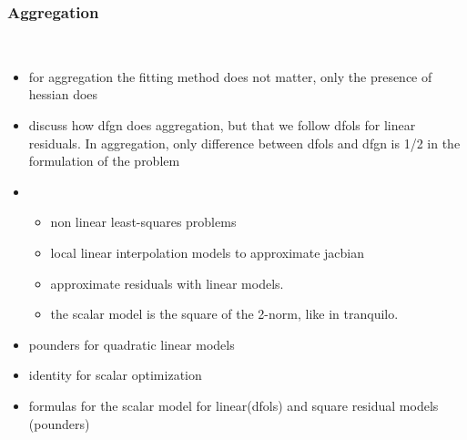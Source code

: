 \subsubsection{Aggregation}
\label{subsubsec:aggregation}
\hfill\\


\begin{itemize}
    \item for aggregation the fitting method does not matter, only the presence of hessian does
    \item discuss how dfgn does aggregation, but that we follow dfols for linear residuals. In aggregation, only difference between dfols and dfgn is 1/2 in the formulation of the problem
    \item

    \begin{itemize}
        \item non linear least-squares problems
        \item local linear interpolation models to approximate jacbian
        \item approximate residuals with linear models.
        \item the scalar model is the square of the 2-norm, like in tranquilo.
    \end{itemize}
    \item pounders for quadratic linear models
    \item identity for scalar optimization
    \item formulas for the scalar model for linear(dfols) and square residual models (pounders)
\end{itemize}
